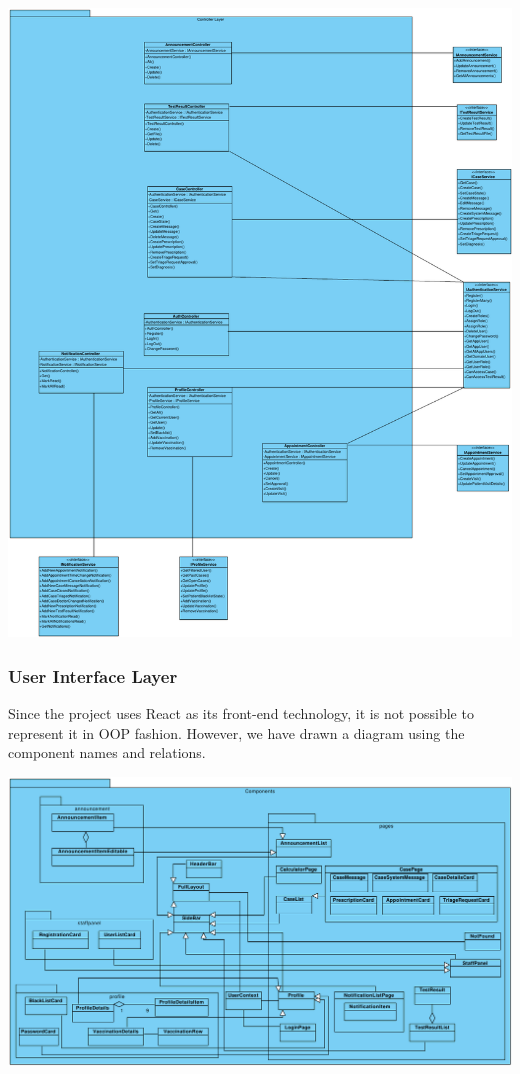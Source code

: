 \documentclass[a4paper, 12pt, titlepage]{article}
\begin{document}
  \includegraphics[width=\linewidth]{controller_layer}

  \pagebreak
  \subsubsection{User Interface Layer}

  Since the project uses React as its front-end technology, it is not possible to represent it in OOP fashion.
  However, we have drawn a diagram using the component names and relations.

  \includegraphics[width=\linewidth]{uisystem}
\end{document}

